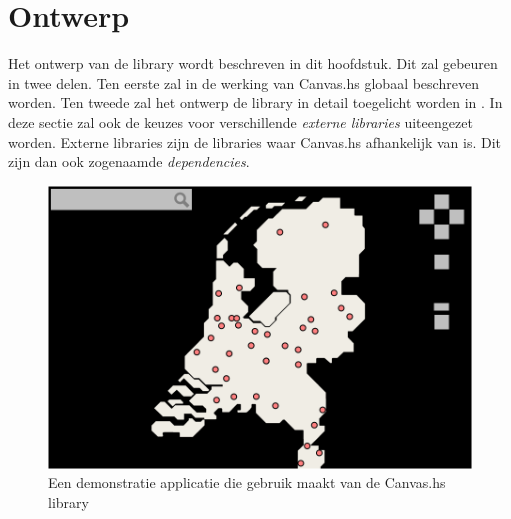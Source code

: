 \chapter{Ontwerp} \label{hoofdstuk:ontwerp}
Het ontwerp van de library wordt beschreven in dit hoofdstuk. Dit zal gebeuren in twee delen. Ten eerste zal in  de werking van Canvas.hs globaal beschreven worden. 
Ten tweede zal het ontwerp de library in detail toegelicht worden in . In deze sectie zal ook de keuzes voor verschillende \emph{externe libraries} uiteengezet worden. Externe libraries zijn de libraries waar Canvas.hs afhankelijk van is. Dit zijn dan ook zogenaamde \emph{dependencies}. 

\begin{figure}[H]
\begin{center}
\includegraphics[keepaspectratio,width=\textwidth]{./images/demo.png}
\caption{Een demonstratie applicatie die gebruik maakt van de Canvas.hs library}
\label{fig:demo_screenshot}
\end{center}
\end{figure}


